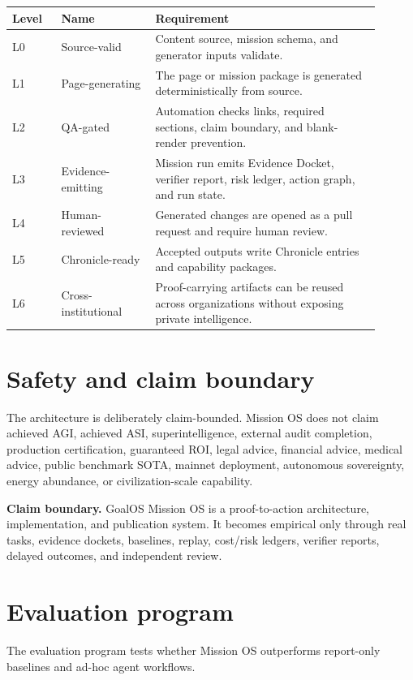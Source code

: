 \documentclass[11pt]{article}
\begin{document}
\begin{longtable}{p{0.12\linewidth}p{0.23\linewidth}p{0.55\linewidth}}
\toprule
\textbf{Level} & \textbf{Name} & \textbf{Requirement} \\
\midrule
L0 & Source-valid & Content source, mission schema, and generator inputs validate. \\
L1 & Page-generating & The page or mission package is generated deterministically from source. \\
L2 & QA-gated & Automation checks links, required sections, claim boundary, and blank-render prevention. \\
L3 & Evidence-emitting & Mission run emits Evidence Docket, verifier report, risk ledger, action graph, and run state. \\
L4 & Human-reviewed & Generated changes are opened as a pull request and require human review. \\
L5 & Chronicle-ready & Accepted outputs write Chronicle entries and capability packages. \\
L6 & Cross-institutional & Proof-carrying artifacts can be reused across organizations without exposing private intelligence. \\
\bottomrule
\end{longtable}

\section{Safety and claim boundary}
The architecture is deliberately claim-bounded. Mission OS does not claim achieved AGI, achieved ASI, superintelligence, external audit completion, production certification, guaranteed ROI, legal advice, financial advice, medical advice, public benchmark SOTA, mainnet deployment, autonomous sovereignty, energy abundance, or civilization-scale capability.

\begin{boundarybox}
\textbf{Claim boundary.} GoalOS Mission OS is a proof-to-action architecture, implementation, and publication system. It becomes empirical only through real tasks, evidence dockets, baselines, replay, cost/risk ledgers, verifier reports, delayed outcomes, and independent review.
\end{boundarybox}

\section{Evaluation program}
The evaluation program tests whether Mission OS outperforms report-only baselines and ad-hoc agent workflows.
\end{document}
